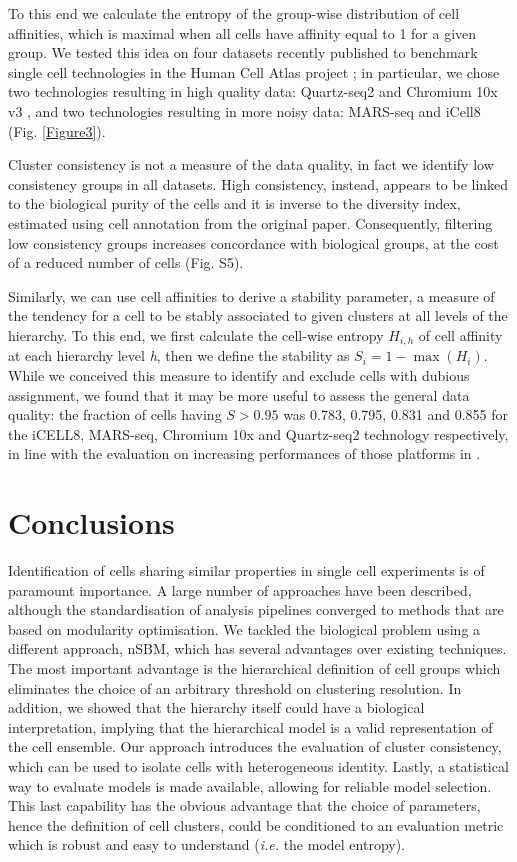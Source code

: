 \documentclass{bmcart}
\begin{document}
To this end we calculate the entropy of the group-wise distribution of cell affinities, which is maximal when all cells have affinity equal to 1 for a given group. We tested this idea on four datasets recently published to benchmark single cell technologies in the Human Cell Atlas project \cite{mereu_2020}; in particular, we chose two technologies resulting in high quality data: Quartz-seq2 \cite{sasagawa_2018} and Chromium 10x v3 \cite{zheng_2017}, and two technologies resulting in more noisy data: MARS-seq \cite{jaitin_2014} and iCell8 \cite{goldstein_2017} (Fig. \ref{Figure3}).

Cluster consistency is not a measure of the data quality, in fact we identify low consistency groups in all datasets. High consistency, instead, appears to be linked to the biological purity of the cells and it is inverse to the diversity index, estimated using cell annotation from the original paper. Consequently, filtering low consistency groups increases concordance with biological groups, at the cost of a reduced number of cells (Fig. S5). 

Similarly, we can use cell affinities to derive a stability parameter, a measure of the tendency for a cell to be stably associated to given clusters at all levels of the hierarchy. To this end, we first calculate the cell-wise entropy $H_{i,h}$ of cell affinity at each hierarchy level \emph{h}, then we define the stability as $S_i = 1 - \max(H_i)$. While we conceived this measure to identify and exclude cells with dubious assignment, we found that it may be more useful to assess the general data quality: the fraction of cells having $S>0.95$ was 0.783, 0.795, 0.831 and 0.855 for the iCELL8, MARS-seq, Chromium 10x and Quartz-seq2 technology respectively, in line with the evaluation on increasing performances of those platforms in \cite{mereu_2020}.

\section*{Conclusions}

Identification of cells sharing similar properties in single cell experiments is of paramount importance. A large number of approaches have been described, although the standardisation of analysis pipelines converged to methods that are based on modularity optimisation. We tackled the biological problem using a different approach, nSBM, which has several advantages over existing techniques. The most important advantage is the hierarchical definition of cell groups which eliminates the choice of an arbitrary threshold on clustering resolution. In addition, we showed that the hierarchy itself could have a biological interpretation, implying that the hierarchical model is a valid representation of the cell ensemble. Our approach introduces the evaluation of cluster consistency, which can be used to isolate cells with heterogeneous identity. Lastly, a statistical way to evaluate models is made available, allowing for reliable model selection. This last capability has the obvious advantage that the choice of parameters, hence the definition of cell clusters, could be conditioned to an evaluation metric which is robust and easy to understand (\emph{i.e.} the model entropy).
\end{document}
